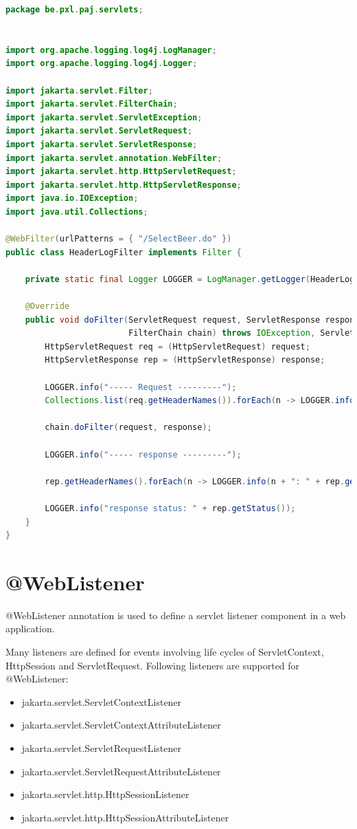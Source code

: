 \begin{lstlisting}[language=java, frame=single]
package be.pxl.paj.servlets;


import org.apache.logging.log4j.LogManager;
import org.apache.logging.log4j.Logger;

import jakarta.servlet.Filter;
import jakarta.servlet.FilterChain;
import jakarta.servlet.ServletException;
import jakarta.servlet.ServletRequest;
import jakarta.servlet.ServletResponse;
import jakarta.servlet.annotation.WebFilter;
import jakarta.servlet.http.HttpServletRequest;
import jakarta.servlet.http.HttpServletResponse;
import java.io.IOException;
import java.util.Collections;

@WebFilter(urlPatterns = { "/SelectBeer.do" })
public class HeaderLogFilter implements Filter {

	private static final Logger LOGGER = LogManager.getLogger(HeaderLogFilter.class);

	@Override
	public void doFilter(ServletRequest request, ServletResponse response,
	                     FilterChain chain) throws IOException, ServletException {
		HttpServletRequest req = (HttpServletRequest) request;
		HttpServletResponse rep = (HttpServletResponse) response;

		LOGGER.info("----- Request ---------");
		Collections.list(req.getHeaderNames()).forEach(n -> LOGGER.info(n + ": " + req.getHeader(n)));

		chain.doFilter(request, response);

		LOGGER.info("----- response ---------");

		rep.getHeaderNames().forEach(n -> LOGGER.info(n + ": " + rep.getHeader(n)));

		LOGGER.info("response status: " + rep.getStatus());
	}
}
\end{lstlisting}


\section{@WebListener}

@WebListener annotation is used to define a servlet listener component in a web application.

Many listeners are defined for events involving life cycles of ServletContext, HttpSession and ServletRequest.  Following listeners are supported for @WebListener:

\begin{itemize}
\item jakarta.servlet.ServletContextListener
\item jakarta.servlet.ServletContextAttributeListener
\item jakarta.servlet.ServletRequestListener
\item jakarta.servlet.ServletRequestAttributeListener
\item jakarta.servlet.http.HttpSessionListener
\item jakarta.servlet.http.HttpSessionAttributeListener
\end{itemize}


